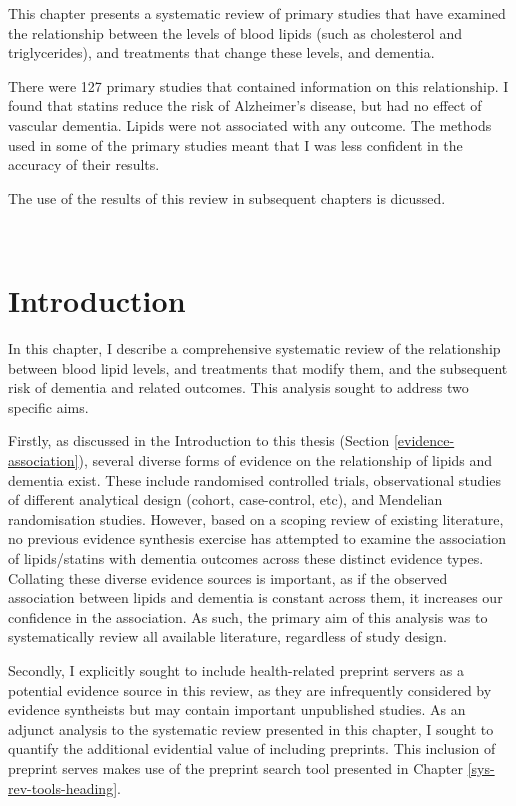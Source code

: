 \documentclass[a4paper, twoside]{templates/ociamthesis}
\begin{document}
This chapter presents a systematic review of primary studies that have examined the relationship between the levels of blood lipids (such as cholesterol and triglycerides), and treatments that change these levels, and dementia.

There were 127 primary studies that contained information on this relationship. I found that statins reduce the risk of Alzheimer's disease, but had no effect of vascular dementia. Lipids were not associated with any outcome. The methods used in some of the primary studies meant that I was less confident in the accuracy of their results.

The use of the results of this review in subsequent chapters is dicussed.

~

\hypertarget{sys-rev-intro}{%
\section{Introduction}\label{sys-rev-intro}}

In this chapter, I describe a comprehensive systematic review of the relationship between blood lipid levels, and treatments that modify them, and the subsequent risk of dementia and related outcomes. This analysis sought to address two specific aims.

Firstly, as discussed in the Introduction to this thesis (Section \ref{evidence-association}), several diverse forms of evidence on the relationship of lipids and dementia exist. These include randomised controlled trials, observational studies of different analytical design (cohort, case-control, etc), and Mendelian randomisation studies. However, based on a scoping review of existing literature, no previous evidence synthesis exercise has attempted to examine the association of lipids/statins with dementia outcomes across these distinct evidence types. Collating these diverse evidence sources is important, as if the observed association between lipids and dementia is constant across them, it increases our confidence in the association. As such, the primary aim of this analysis was to systematically review all available literature, regardless of study design.

Secondly, I explicitly sought to include health-related preprint servers as a potential evidence source in this review, as they are infrequently considered by evidence syntheists but may contain important unpublished studies. As an adjunct analysis to the systematic review presented in this chapter, I sought to quantify the additional evidential value of including preprints. This inclusion of preprint serves makes use of the preprint search tool presented in Chapter \ref{sys-rev-tools-heading}.
\end{document}
